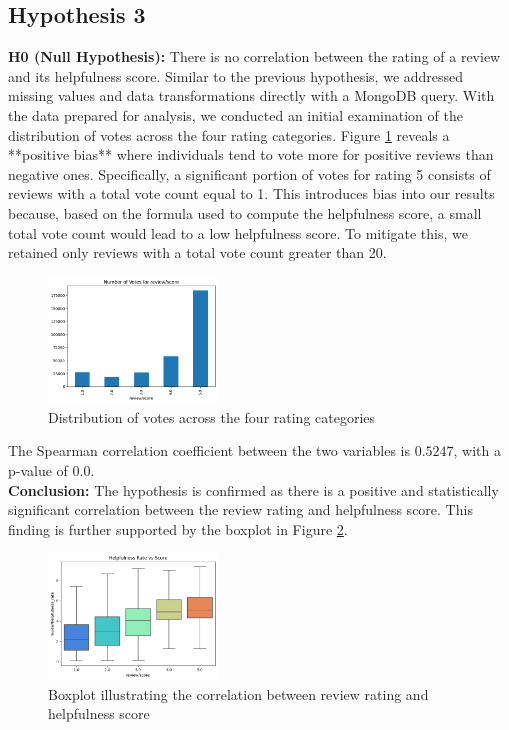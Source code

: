 \subsection*{Hypothesis 3}

\textbf{H0 (Null Hypothesis):} There is no correlation between the rating of a review and its helpfulness score.
\noindent
Similar to the previous hypothesis, we addressed missing values and data transformations directly with a MongoDB query.
With the data prepared for analysis, we conducted an initial examination of the distribution of votes across the four rating
categories. Figure \ref{fig:h3_votes_distribution} reveals a **positive bias** where individuals tend to vote more for
positive reviews than negative ones. Specifically, a significant portion of votes for rating 5 consists of reviews with a
total vote count equal to 1. This introduces bias into our results because, based on the formula used to compute the
helpfulness score, a small total vote count would lead to a low helpfulness score. To mitigate this, we retained only
reviews with a total vote count greater than 20.

\begin{figure}[H]
    \centering
    \includegraphics[width=0.4\textwidth]{./figures/h3_votes_distribution.png}
    \caption{Distribution of votes across the four rating categories}
    \label{fig:h3_votes_distribution}
\end{figure}

\noindent
The Spearman correlation coefficient between the two variables is $0.5247$, with a p-value of $0.0$.\\
\textbf{Conclusion:}
The hypothesis is confirmed as there is a positive and statistically significant correlation between the review rating
and helpfulness score. This finding is further supported by the boxplot in Figure \ref{fig:h3_boxplot}.

\begin{figure}[H]
    \centering
    \includegraphics[width=0.4\textwidth]{./figures/h3_boxplot.png}
    \caption{Boxplot illustrating the correlation between review rating and helpfulness score}
    \label{fig:h3_boxplot}
\end{figure}
